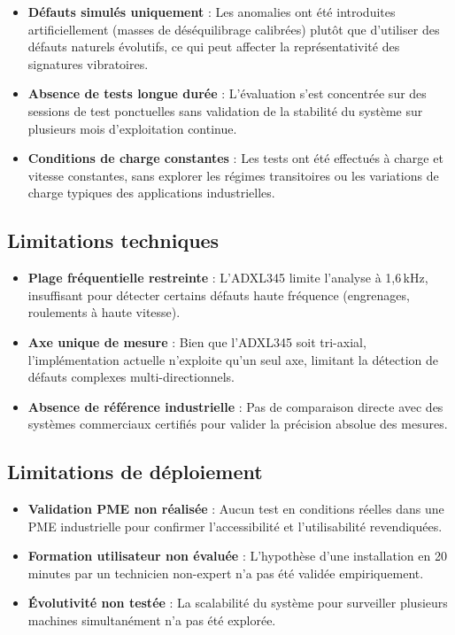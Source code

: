 \begin{itemize}
    \item \textbf{Défauts simulés uniquement} : Les anomalies ont été introduites artificiellement (masses de déséquilibrage calibrées) plutôt que d'utiliser des défauts naturels évolutifs, ce qui peut affecter la représentativité des signatures vibratoires.

    \item \textbf{Absence de tests longue durée} : L'évaluation s'est concentrée sur des sessions de test ponctuelles sans validation de la stabilité du système sur plusieurs mois d'exploitation continue.

    \item \textbf{Conditions de charge constantes} : Les tests ont été effectués à charge et vitesse constantes, sans explorer les régimes transitoires ou les variations de charge typiques des applications industrielles.
\end{itemize}

\subsection{Limitations techniques}

\begin{itemize}
    \item \textbf{Plage fréquentielle restreinte} : L'ADXL345 limite l'analyse à 1,6\,kHz, insuffisant pour détecter certains défauts haute fréquence (engrenages, roulements à haute vitesse).

    \item \textbf{Axe unique de mesure} : Bien que l'ADXL345 soit tri-axial, l'implémentation actuelle n'exploite qu'un seul axe, limitant la détection de défauts complexes multi-directionnels.

    \item \textbf{Absence de référence industrielle} : Pas de comparaison directe avec des systèmes commerciaux certifiés pour valider la précision absolue des mesures.
\end{itemize}

\subsection{Limitations de déploiement}

\begin{itemize}
    \item \textbf{Validation PME non réalisée} : Aucun test en conditions réelles dans une PME industrielle pour confirmer l'accessibilité et l'utilisabilité revendiquées.

    \item \textbf{Formation utilisateur non évaluée} : L'hypothèse d'une installation en 20 minutes par un technicien non-expert n'a pas été validée empiriquement.

    \item \textbf{Évolutivité non testée} : La scalabilité du système pour surveiller plusieurs machines simultanément n'a pas été explorée.
\end{itemize}

